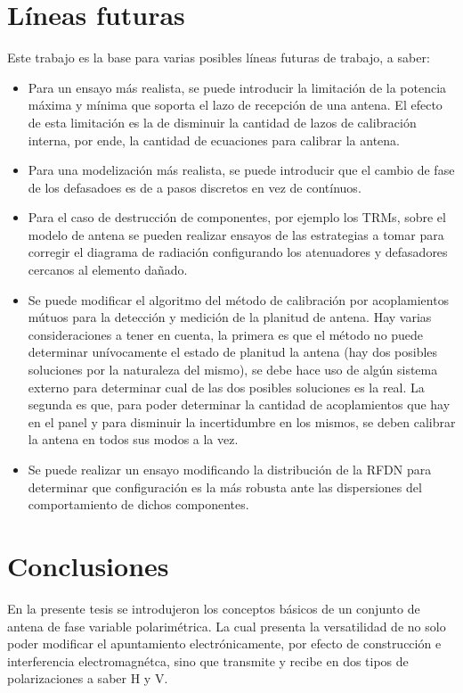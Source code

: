 \section{Líneas futuras}

Este trabajo es la base para varias posibles líneas futuras de trabajo, a saber:
\begin{itemize}
	\item Para un ensayo más realista, se puede introducir la limitación de la potencia máxima y mínima que soporta el lazo 
		de recepción de una antena. El efecto de esta limitación es la de disminuir la cantidad de lazos de calibración interna, 
		por ende, la cantidad de ecuaciones para calibrar la antena.
	\item Para una modelización más realista, se puede introducir que el cambio de fase de los defasadoes es de a pasos discretos
		en vez de contínuos.
	\item Para el caso de destrucción de componentes, por ejemplo los TRMs, sobre el modelo de antena se pueden realizar ensayos 
		de las estrategias a tomar para corregir el diagrama de radiación configurando los atenuadores y defasadores cercanos al 
		elemento dañado.
	\item Se puede modificar el algoritmo del método de calibración por acoplamientos mútuos para la detección y medición de 
		la planitud de antena. Hay varias consideraciones a tener en cuenta, la primera es que el método no puede determinar 
		unívocamente el estado de planitud la antena (hay dos posibles soluciones por la naturaleza del mismo), se debe hace uso de 
		algún sistema externo para determinar cual de las dos posibles soluciones es la real. La segunda es que, para poder determinar
		la cantidad de acoplamientos que hay en el panel y para disminuir la incertidumbre en los mismos, se deben calibrar la antena 
		en todos sus modos a la vez.
	\item Se puede realizar un ensayo modificando la distribución de la RFDN para determinar que configuración es la más robusta ante 
		las dispersiones del comportamiento de dichos componentes.
\end{itemize}

\section{Conclusiones}

En la presente tesis se introdujeron los conceptos básicos de un conjunto de antena de fase variable polarimétrica. La cual 
presenta la versatilidad de no solo poder modificar el apuntamiento electrónicamente, por efecto de construcción e interferencia 
electromagnétca, sino que transmite y recibe en dos tipos de polarizaciones a saber H y V.

